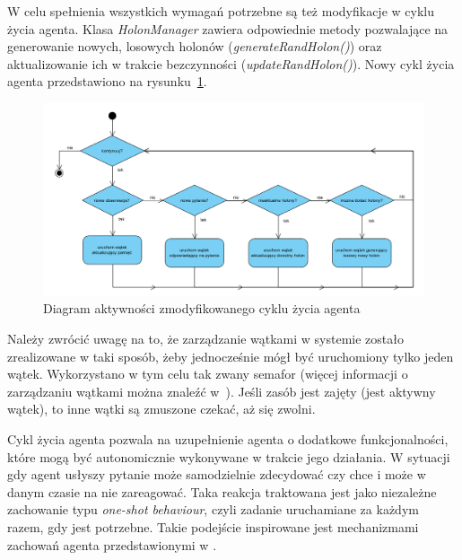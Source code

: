 W celu spełnienia wszystkich wymagań potrzebne są też modyfikacje w cyklu życia agenta. Klasa \textit{HolonManager} zawiera odpowiednie metody pozwalające na generowanie nowych, losowych holonów (\textit{generateRandHolon()}) oraz aktualizowanie ich w trakcie bezczynności (\textit{updateRandHolon()}). Nowy cykl życia agenta przedstawiono na rysunku~\ref{rys:cykl}. 

\begin{figure}  
	\centering\includegraphics[width=\textwidth]{img/cykl}
	\caption{Diagram aktywności zmodyfikowanego cyklu życia agenta}
	\label{rys:cykl}
\end{figure}

Należy zwrócić uwagę na to, że zarządzanie wątkami w systemie zostało zrealizowane w taki sposób, żeby jednocześnie mógł być uruchomiony tylko jeden wątek. Wykorzystano w tym celu tak zwany semafor (więcej informacji o zarządzaniu wątkami można znaleźć w~\cite{java}). Jeśli zasób jest zajęty (jest aktywny wątek), to inne wątki są zmuszone czekać, aż się zwolni.

Cykl życia agenta pozwala na uzupełnienie agenta o dodatkowe funkcjonalności, które mogą być autonomicznie wykonywane w trakcie jego działania. W sytuacji gdy agent usłyszy pytanie może samodzielnie zdecydować czy chce i może w danym czasie na nie zareagować. Taka reakcja traktowana jest jako niezależne zachowanie typu \textit{one-shot behaviour}, czyli zadanie uruchamiane za każdym razem, gdy jest potrzebne. Takie podejście inspirowane jest mechanizmami zachowań agenta przedstawionymi w \cite{jade}. 



